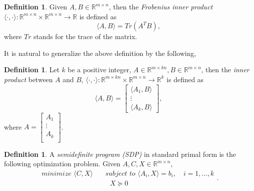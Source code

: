 \documentclass[12pt]{amsart}
\numberwithin{equation}{section}
\theoremstyle{definition}
\newtheorem{definition}[thm]{Definition}
\numberwithin{thm}{section}
\begin{document}
\begin{definition}
     \label{def: mtx_inner_product}
     Given $A, B \in \mathbb{R}^{m \times n}$, then the \emph{Frobenius inner product}\\ $\langle \cdot, \cdot \rangle: \mathbb{R}^{m \times n} \times \mathbb{R}^{m \times n} \to \mathbb{R}$ is defined as
     \begin{equation*}
          \langle A, B \rangle = Tr(A^TB),
     \end{equation*}
     where $Tr$ stands for the trace of the matrix.
\end{definition}

It is natural to generalize the above definition by the following,
\begin{definition}
     \label{def: mtx_inner_product_concat}
     Let $k$ be a positive integer, $A \in \mathbb{R}^{m \times kn}, B \in \mathbb{R}^{m \times n}$, then the \emph{inner product} between $A$ and $B$, $\langle \cdot, \cdot \rangle: \mathbb{R}^{m \times kn} \times \mathbb{R}^{m \times n} \to \mathbb{R}^k$ is defined as
     \begin{equation*}
          \langle A, B \rangle = \begin{bmatrix}
               \langle A_1, B \rangle \\
               \vdots\\
               \langle A_k, B \rangle
          \end{bmatrix},
     \end{equation*}
     where $A = \begin{bmatrix}
          A_1\\
          \vdots\\
          A_k\\
     \end{bmatrix}$.
\end{definition}

\begin{definition}
     \label{def:SDP}
     A \emph{semidefinite program (SDP)} in standard primal form is the following optimization problem.
     Given $A, C, X \in \mathbb{R}^{m \times n}$, 
     \begin{equation}\label{eq:2.3}
          \begin{split}
               \textit{minimize } \langle C, X \rangle & \quad \textit{subject to } \langle A_i, X \rangle = b_i, \quad i=1,...,k \\
               & \quad \textit{\ \ \ \ \ \ \ \ \ \ \ \ \ \ } X \succcurlyeq 0 
          \end{split}.
     \end{equation}
\end{definition}
\end{document}
